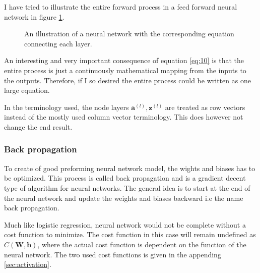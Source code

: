 \documentclass[uio,jmp,amsmath,amssymb,reprint,nofootinbib]{revtex4-1}
\numberwithin{equation}{section}
\newcommand{\lp}{\left(}
\newcommand{\rp}{\right)}
\begin{document}
I have tried to illustrate the entire forward process in a feed forward neural network in figure \ref{fig:01}.

\begin{figure}[H]
\scalebox{0.70}{
\begin{neuralnetwork}[height=4.4, layerspacing = 34mm]
\newcommand{\x}[2]{$x_#2$}
\newcommand{\y}[2]{$\hat{y}_#2$}
\newcommand{\hfirst}[2]{\small $a^{(1)}_#2$}
\newcommand{\hsecond}[2]{\small $a^{(2)}_#2$}
\inputlayer[count=3, bias=false, title=\(\bm{X}_i\), text=\x]
\hiddenlayer[count=4, bias=false, title=\(f_1\lp \bm{X}_i\bm{W}^{(1)} + \bm{b}^{(1)}\rp\), text=\hfirst, widetitle = true] \linklayers
\hiddenlayer[count=3, bias=false, title=\(f_2\lp \bm{a}^{(1)}\bm{W}^{(2)} + \bm{b}^{(2)}\rp\), text=\hsecond, widetitle=true] \linklayers
\outputlayer[count=2, title=\(f_3\lp \bm{a}^{(2)}\bm{W}^{(3)} + \bm{b}^{(3)}\rp\), text=\y, widetitle=true] \linklayers
\end{neuralnetwork}}
\caption{An illustration of a neural network with the corresponding equation connecting each layer.}
\label{fig:01}
\end{figure}

An interesting and very important consequence of equation \ref{eq:10} is that the entire process is just a continuously mathematical mapping from the inputs to the outputs. Therefore, if I so desired the entire process could be written as one large equation.

In the terminology used, the node layers \(\bm{a}^{(l)}, \bm{z}^{(l)}\) are treated as row vectors instead of the mostly used column vector terminology. This does however not change the end result.

\subsubsection{Back propagation}

To create of good preforming neural network model, the wights and biases has to be optimized. This process is called back propagation and is a gradient decent type of algorithm for neural networks. The general idea is to start at the end of the neural network and update the weights and biases backward i.e the name back propagation.

Much like logistic regression, neural network would not be complete without a cost function to minimize. The cost function in this case will remain undefined as \(C(\bm{W}, \bm{b})\), where the actual cost function is dependent on the function of the neural network. The two used cost functions is given in the appending \ref{sec:activation}.
\end{document}
